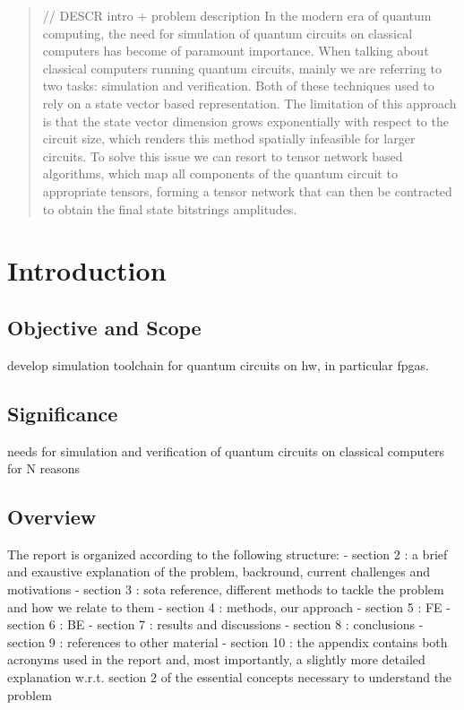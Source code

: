 \documentclass[12pt,oneside,a4paper]{article}
\begin{document}
\begin{abstract}
// DESCR intro + problem description
In the modern era of quantum computing, the need for simulation of quantum circuits on classical computers has become of paramount importance. When talking about classical computers running quantum circuits, mainly we are referring to two tasks: simulation and verification. Both of these techniques used to rely on a state vector based representation. The limitation of this approach is that the state vector dimension grows exponentially with respect to the circuit size, which renders this method spatially infeasible for larger circuits. To solve this issue we can resort to tensor network based algorithms, which map all components of the quantum circuit to appropriate tensors, forming a tensor network that can then be contracted to obtain the final state bitstrings amplitudes.

\end{abstract}



\section{Introduction} 

\subsection{Objective and Scope}
develop simulation toolchain for quantum circuits on hw, in particular fpgas. 


\subsection{Significance}
needs for simulation and verification of quantum circuits on classical computers for N reasons

\subsection{Overview}
The report is organized according to the following structure:
- section 2 : a brief and exaustive explanation of the problem, backround, current challenges and motivations
- section 3 : sota reference, different methods to tackle the problem and how we relate to them
- section 4 : methods, our approach
- section 5 : FE
- section 6 : BE
- section 7 : results and discussions
- section 8 : conclusions
- section 9 : references to other material
- section 10 : the appendix contains both acronyms used in the report and, most importantly, a slightly more detailed explanation w.r.t. section 2 of the essential concepts necessary to understand the problem
\end{document}
